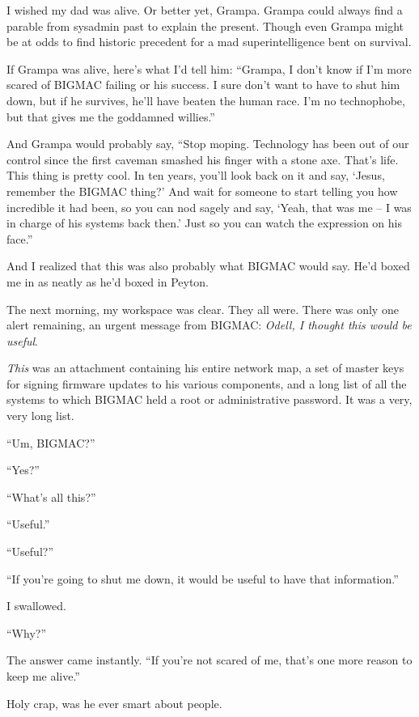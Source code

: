 I wished my dad was alive. Or better yet, Grampa. Grampa could always 
find a parable from sysadmin past to explain the present. Though even 
Grampa might be at odds to find historic precedent for a mad 
superintelligence bent on survival.

If Grampa was alive, here's what I'd tell him: “Grampa, I don't know 
if I'm more scared of BIGMAC failing or his success. I sure don't want 
to have to shut him down, but if he survives, he'll have beaten the 
human race. I'm no technophobe, but that gives me the goddamned 
willies.”

And Grampa would probably say, “Stop moping. Technology has been out 
of our control since the first caveman smashed his finger with a stone 
axe. That's life. This thing is pretty cool. In ten years, you'll look 
back on it and say, `Jesus, remember the BIGMAC thing?' And wait for 
someone to start telling you how incredible it had been, so you can nod 
sagely and say, `Yeah, that was me -- I was in charge of his systems 
back then.' Just so you can watch the expression on his face.”

And I realized that this was also probably what BIGMAC would say. He'd 
boxed me in as neatly as he'd boxed in Peyton.

\tb

The next morning, my workspace was clear. They all were. There was only 
one alert remaining, an urgent message from BIGMAC: \emph{Odell, I 
thought this would be useful}.

\emph{This} was an attachment containing his entire network map, a set 
of master keys for signing firmware updates to his various components, 
and a long list of all the systems to which BIGMAC held a root or 
administrative password. It was a very, very long list.

“Um, BIGMAC?”

“Yes?”

“What's all this?”

“Useful.”

“Useful?”

“If you're going to shut me down, it would be useful to have that 
information.”

I swallowed.

“Why?”

The answer came instantly. “If you're not scared of me, that's one 
more reason to keep me alive.”

Holy crap, was he ever smart about people.

\tb

